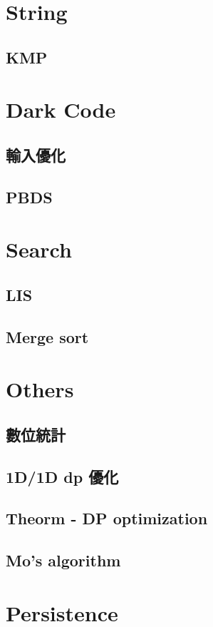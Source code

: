 \section{String}

\subsection{KMP}



\section{Dark Code}

\subsection{輸入優化}

\subsection{PBDS}


\section{Search}

\subsection{LIS}

\subsection{Merge sort}



\section{Others}

\subsection{數位統計}

\subsection{1D/1D dp 優化}

\subsection{Theorm - DP optimization}

\subsection{Mo's algorithm}




\section{Persistence}

